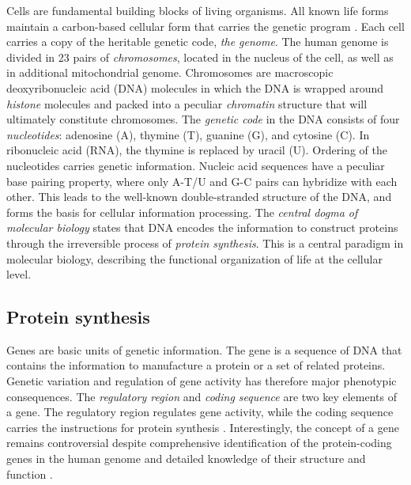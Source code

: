 Cells are fundamental building blocks of living organisms. All known
life forms maintain a carbon-based cellular form that carries the
genetic program \citep{Alberts02}. Each cell carries a copy of the
heritable genetic code, {\it the genome}. The human genome is divided
in 23 pairs of {\it chromosomes}, located in the nucleus of the cell,
as well as in additional mitochondrial genome. Chromosomes are
macroscopic deoxyribonucleic acid (DNA) molecules in which the DNA is
wrapped around {\it histone} molecules and packed into a peculiar {\it
  chromatin} structure that will ultimately constitute
chromosomes. The {\it genetic code} in the DNA consists of four {\it
  nucleotides}: adenosine (A), thymine (T), guanine (G), and cytosine
(C). In ribonucleic acid (RNA), the thymine is replaced by uracil
(U). Ordering of the nucleotides carries genetic information. Nucleic
acid sequences have a peculiar base pairing property, where only A-T/U
and G-C pairs can hybridize with each other. This leads to the
well-known double-stranded structure of the DNA, and forms the basis
for cellular information processing.  The \emph{central dogma of
  molecular biology} \citep{Crick70} states that DNA encodes the
information to construct proteins through the irreversible process of
{\it protein synthesis}. This is a central paradigm in molecular
biology, describing the functional organization of life at the
cellular level.

\subsection{Protein synthesis}

Genes are basic units of genetic information.  The gene is a sequence
of DNA that contains the information to manufacture a protein or a set
of related proteins. Genetic variation and regulation of gene activity
has therefore major phenotypic consequences. The {\it regulatory
  region} and {\it coding sequence} are two key elements of a
gene. The regulatory region regulates gene activity, while the coding
sequence carries the instructions for protein synthesis
\citep{Alberts02}. Interestingly, the concept of a gene remains
controversial despite comprehensive identification of the
protein-coding genes in the human genome and detailed knowledge of
their structure and function \citep{Pearson2006}.

